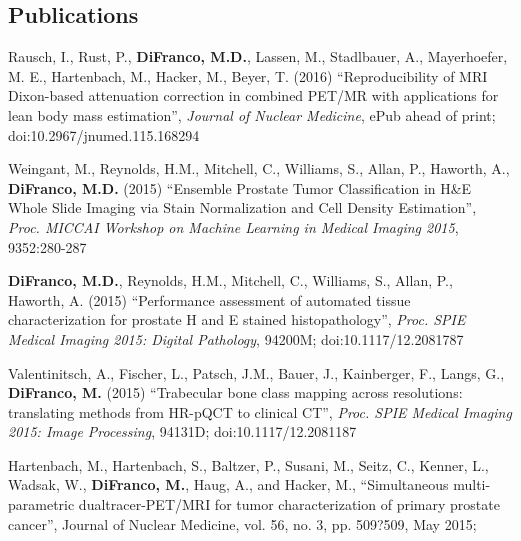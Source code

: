 \documentclass[line,a4paper]{resume}
\begin{document}
\begin{resume}
    \section{\mysidestyle Publications}\vspace{2mm}
	\begin{minipage}{\textwidth}
	Rausch, I., Rust, P., \textbf{DiFranco, M.D.}, Lassen, M., Stadlbauer, A., Mayerhoefer, M. E., Hartenbach, M., Hacker, M., Beyer, T. (2016) ``Reproducibility of MRI Dixon-based attenuation correction in combined PET/MR with applications for lean body mass estimation'', \emph{Journal of Nuclear Medicine}, ePub ahead of print; doi:10.2967/jnumed.115.168294 \\[2mm]
	\end{minipage}	
	\begin{minipage}{\textwidth}
	Weingant, M., Reynolds, H.M., Mitchell, C., Williams, S., Allan, P., Haworth, A., \textbf{DiFranco, M.D.} (2015) ``Ensemble Prostate Tumor Classification in H\&E Whole Slide Imaging via Stain Normalization and Cell Density Estimation'', \emph{Proc. MICCAI Workshop on Machine Learning in Medical Imaging 2015}, 9352:280-287 \\[2mm]
	\end{minipage}	
	\begin{minipage}{\textwidth}
	\textbf{DiFranco, M.D.}, Reynolds, H.M., Mitchell, C., Williams, S., Allan, P., Haworth, A. (2015) ``Performance assessment of automated tissue characterization for prostate H and E stained histopathology'', \emph{Proc. SPIE Medical Imaging 2015: Digital Pathology}, 94200M; doi:10.1117/12.2081787\\[2mm]
	\end{minipage}
	\begin{minipage}{\textwidth}
	Valentinitsch, A., Fischer, L., Patsch, J.M., Bauer, J., Kainberger, F., Langs, G., \textbf{DiFranco, M.} (2015) ``Trabecular bone class mapping across resolutions: translating methods from HR-pQCT to clinical CT'', \emph{Proc. SPIE Medical Imaging 2015: Image Processing}, 94131D; doi:10.1117/12.2081187\\[2mm]
	\end{minipage}
	\begin{minipage}{\textwidth}
	Hartenbach, M., Hartenbach, S., Baltzer, P., Susani, M., Seitz, C., Kenner, L., Wadsak, W., \textbf{DiFranco, M.}, Haug, A., and Hacker, M., ``Simultaneous multi-parametric dualtracer-PET/MRI for tumor characterization of primary prostate cancer'', Journal of Nuclear Medicine, vol. 56, no. 3, pp. 509?509, May 2015; \\[2mm]

\end{minipage}
\end{resume}
\end{document}
